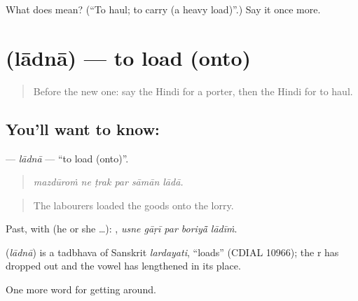 \begin{tcolorbox}[breakable,colback=teal!4,colframe=teal!35!black,title={Before you move on}]
What does  mean? (\textquotedblleft{}To haul; to carry (a heavy load)\textquotedblright{}.) Say it once more.
\end{tcolorbox}
\section[\texorpdfstring{\hi{लादना} (lādnā)}{लादना (lādnā)}]{ (lādnā) — to load (onto)}

\label{lesson:HI-C398-ladna}



\begin{quote}
Before the new one: say the Hindi for a porter, then the Hindi for to haul.
\end{quote}

\subsection*{You'll want to know: }
\textbf{} — \emph{lādnā} — \textquotedblleft{}to load (onto)\textquotedblright{}.

\begin{quote}
     
\end{quote}

\begin{quote}
\emph{mazdūroṁ ne ṭrak par sāmān lādā.}
\end{quote}

\begin{quote}
The labourers loaded the goods onto the lorry.
\end{quote}

Past, with  (he or she …):     , \emph{usne gāṛī par boriyā̃ lādīṁ}.

\begin{cousinweb}
\textbf{} (\emph{lādnā}) is a tadbhava of Sanskrit \emph{lardayati}, \textquotedblleft{}loads\textquotedblright{} (CDIAL 10966); the r has dropped out and the vowel has lengthened in its place.
\end{cousinweb}

\begin{grammarlens}[title={What you've built}]
One more word for getting around.
\end{grammarlens}

